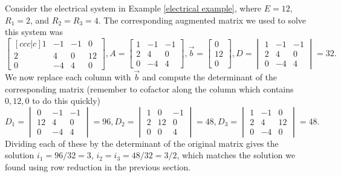 \begin{example}
Consider the electrical system in Example \ref{electrical example}, where $E=12$, $R_1=2$, and $R_2=R_3=4$. 
The corresponding augmented matrix we used to solve this system was 
$$
\begin{bmatrix}[ccc|c]
1&-1&-1&0\\
2&4&0&12\\
0&-4&4&0
\end{bmatrix}, 
A=
\begin{bmatrix}1&-1&-1\\2&4&0\\0&-4&4\end{bmatrix}, 
\vec b=\begin{bmatrix}
0\\
12\\
0
\end{bmatrix},D=\begin{vmatrix} 1&-1&-1\\2&4&0\\0&-4&4 \end {vmatrix} =32. 
$$ 
We now replace each column with $\vec b$ and compute the determinant of the corresponding matrix (remember to cofactor along the column which contains $0,12,0$ to do this quickly)
$$ 
D_1=\begin{vmatrix} 0&-1&-1\\12&4&0\\0&-4&4 \end {vmatrix} =96,
D_2=\begin{vmatrix} 1&0&-1\\2&12&0\\0&0&4 \end {vmatrix} =48, 
D_3=\begin{vmatrix} 1&-1&0\\2&4&12\\0&-4&0 \end {vmatrix} =48. 
$$
Dividing each of these by the determinant of the original matrix gives the solution $i_1 = 96/32 = 3$, $i_2=i_3=48/32 = 3/2$, which matches the solution we found using row reduction in the previous section. 
\end{example}



















